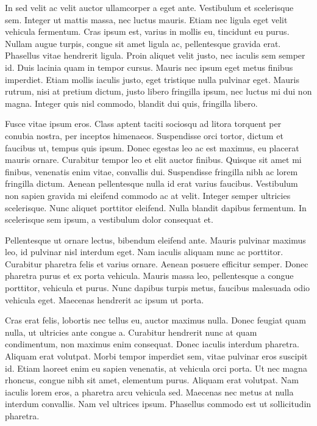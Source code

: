 \documentclass[
  11pt,
  a4paper,
]{scrreprt}
\begin{document}
In sed velit ac velit auctor ullamcorper a eget ante. Vestibulum et
scelerisque sem. Integer ut mattis massa, nec luctus mauris. Etiam nec
ligula eget velit vehicula fermentum. Cras ipsum est, varius in mollis
eu, tincidunt eu purus. Nullam augue turpis, congue sit amet ligula ac,
pellentesque gravida erat. Phasellus vitae hendrerit ligula. Proin
aliquet velit justo, nec iaculis sem semper id. Duis lacinia quam in
tempor cursus. Mauris nec ipsum eget metus finibus imperdiet. Etiam
mollis iaculis justo, eget tristique nulla pulvinar eget. Mauris rutrum,
nisi at pretium dictum, justo libero fringilla ipsum, nec luctus mi dui
non magna. Integer quis nisl commodo, blandit dui quis, fringilla
libero.

Fusce vitae ipsum eros. Class aptent taciti sociosqu ad litora torquent
per conubia nostra, per inceptos himenaeos. Suspendisse orci tortor,
dictum et faucibus ut, tempus quis ipsum. Donec egestas leo ac est
maximus, eu placerat mauris ornare. Curabitur tempor leo et elit auctor
finibus. Quisque sit amet mi finibus, venenatis enim vitae, convallis
dui. Suspendisse fringilla nibh ac lorem fringilla dictum. Aenean
pellentesque nulla id erat varius faucibus. Vestibulum non sapien
gravida mi eleifend commodo ac at velit. Integer semper ultricies
scelerisque. Nunc aliquet porttitor eleifend. Nulla blandit dapibus
fermentum. In scelerisque sem ipsum, a vestibulum dolor consequat et.

Pellentesque ut ornare lectus, bibendum eleifend ante. Mauris pulvinar
maximus leo, id pulvinar nisl interdum eget. Nam iaculis aliquam nunc ac
porttitor. Curabitur pharetra felis et varius ornare. Aenean posuere
efficitur semper. Donec pharetra purus et ex porta vehicula. Mauris
massa leo, pellentesque a congue porttitor, vehicula et purus. Nunc
dapibus turpis metus, faucibus malesuada odio vehicula eget. Maecenas
hendrerit ac ipsum ut porta.

Cras erat felis, lobortis nec tellus eu, auctor maximus nulla. Donec
feugiat quam nulla, ut ultricies ante congue a. Curabitur hendrerit nunc
at quam condimentum, non maximus enim consequat. Donec iaculis interdum
pharetra. Aliquam erat volutpat. Morbi tempor imperdiet sem, vitae
pulvinar eros suscipit id. Etiam laoreet enim eu sapien venenatis, at
vehicula orci porta. Ut nec magna rhoncus, congue nibh sit amet,
elementum purus. Aliquam erat volutpat. Nam iaculis lorem eros, a
pharetra arcu vehicula sed. Maecenas nec metus at nulla interdum
convallis. Nam vel ultrices ipsum. Phasellus commodo est ut sollicitudin
pharetra.
\end{document}
